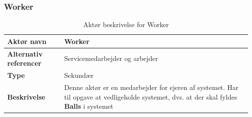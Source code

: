 \documentclass[Kravspecifikation/Kravspec_Main.tex]{subfiles}
\begin{document}
\subsubsection{Worker}
\begin{table}[H]
    \centering
    \begin{tabular}{|L{0.35\textwidth}|L{0.65\textwidth}|}
        \hline
        \textbf{Aktør navn} & Worker \\ \hline
        \textbf{Alternativ referencer} & Servicemedarbejder og arbejder \\ \hline
        \textbf{Type} & Sekundær\\ \hline
        \textbf{Beskrivelse} & Denne aktør er en medarbejder for ejeren af systemet. Har til opgave at vedligeholde systemet, dvs. at der skal fyldes \textbf{Balls} i systemet\\ \hline
    \end{tabular}
    \caption{Aktør beskrivelse for Worker}
    \label{tab:WorkerBeskrivelse}
\end{table}
\end{document}
